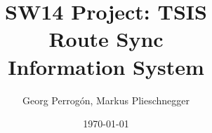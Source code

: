 \documentclass{beamer}
\title[Thema oder andere gleichbleibende Information]{SW14 Project: TSIS\\
Route Sync\\
Information System}
\author{Georg Perrogón, Markus Plieschnegger}
\date{\today}
\begin{document}
\titleframe






\end{document}
